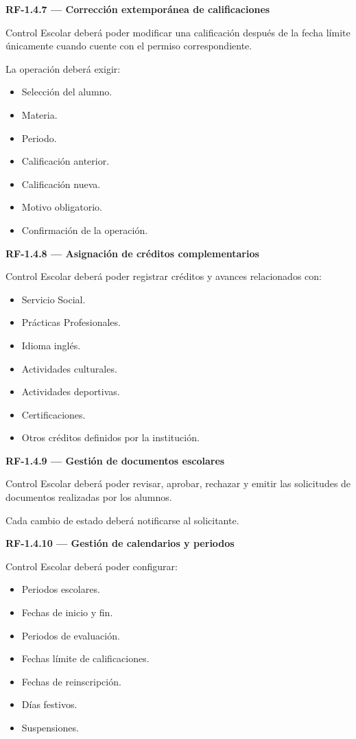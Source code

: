 \documentclass[12pt,a4paper]{article}
\newcommand{\RF}[1]{\textbf{\color{primary}RF-#1}}
\newenvironment{requisito}[1]
{
\begin{center}
\begin{minipage}{0.96\textwidth}
\colorbox{requirement}{
\begin{minipage}{0.94\textwidth}
\textbf{#1}
\end{minipage}
}
\vspace{2mm}
}
{
\end{minipage}
\end{center}
}
\begin{document}
\begin{requisito}{\RF{1.4.7} --- Corrección extemporánea de calificaciones}
Control Escolar deberá poder modificar una calificación después de la fecha
límite únicamente cuando cuente con el permiso correspondiente.

La operación deberá exigir:

\begin{itemize}[leftmargin=*]
\item Selección del alumno.
\item Materia.
\item Periodo.
\item Calificación anterior.
\item Calificación nueva.
\item Motivo obligatorio.
\item Confirmación de la operación.
\end{itemize}
\end{requisito}

\begin{requisito}{\RF{1.4.8} --- Asignación de créditos complementarios}
Control Escolar deberá poder registrar créditos y avances relacionados con:

\begin{itemize}[leftmargin=*]
\item Servicio Social.
\item Prácticas Profesionales.
\item Idioma inglés.
\item Actividades culturales.
\item Actividades deportivas.
\item Certificaciones.
\item Otros créditos definidos por la institución.
\end{itemize}
\end{requisito}

\begin{requisito}{\RF{1.4.9} --- Gestión de documentos escolares}
Control Escolar deberá poder revisar, aprobar, rechazar y emitir las solicitudes
de documentos realizadas por los alumnos.

Cada cambio de estado deberá notificarse al solicitante.
\end{requisito}

\begin{requisito}{\RF{1.4.10} --- Gestión de calendarios y periodos}
Control Escolar deberá poder configurar:

\begin{itemize}[leftmargin=*]
\item Periodos escolares.
\item Fechas de inicio y fin.
\item Periodos de evaluación.
\item Fechas límite de calificaciones.
\item Fechas de reinscripción.
\item Días festivos.
\item Suspensiones.
\end{itemize}
\end{requisito}
\end{document}
